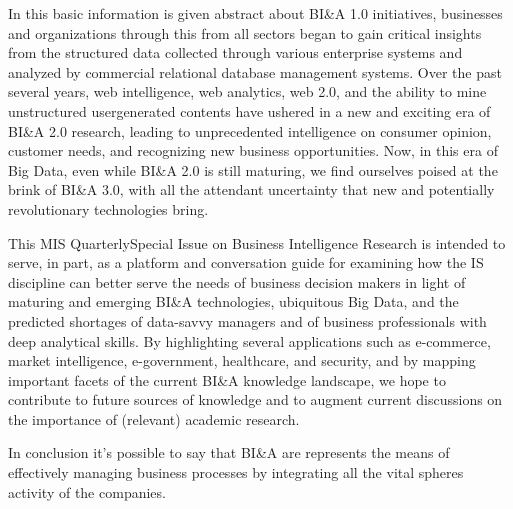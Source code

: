 In this basic information is given abstract about BI\&A 1.0 initiatives, businesses and organizations through this
from all sectors began to gain critical insights from the
structured data collected through various enterprise systems
and analyzed by commercial relational database management
systems. Over the past several years, web intelligence, web
analytics, web 2.0, and the ability to mine unstructured usergenerated contents have ushered in a new and exciting era of
BI\&A 2.0 research, leading to unprecedented intelligence on
consumer opinion, customer needs, and recognizing new
business opportunities. Now, in this era of Big Data, even
while BI\&A 2.0 is still maturing, we find ourselves poised at
the brink of BI\&A 3.0, with all the attendant uncertainty that
new and potentially revolutionary technologies bring.

This MIS QuarterlySpecial Issue on Business Intelligence
Research is intended to serve, in part, as a platform and
conversation guide for examining how the IS discipline can
better serve the needs of business decision makers in light of
maturing and emerging BI\&A technologies, ubiquitous Big
Data, and the predicted shortages of data-savvy managers and
of business professionals with deep analytical skills.
By highlighting several applications such as e-commerce,
market intelligence, e-government, healthcare, and security,
and by mapping important facets of the current BI\&A
knowledge landscape, we hope to contribute to future sources
of knowledge and to augment current discussions on the
importance of (relevant) academic research.

In conclusion it’s possible to say that BI\&A are represents the means of effectively managing business processes by integrating all the vital spheres activity of the companies.